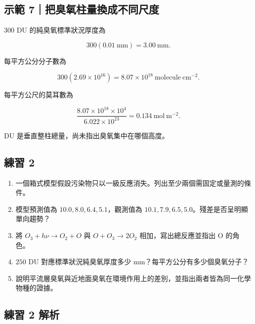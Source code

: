 \documentclass[11pt,a4paper]{article}
\providecommand{\tightlist}{%
  \setlength{\itemsep}{0pt}\setlength{\parskip}{0pt}}
\begin{document}
\begin{HandoutWorkedExample}

\subsection{示範 7｜把臭氧柱量換成不同尺度}\label{ux793aux7bc4-7ux628aux81edux6c27ux67f1ux91cfux63dbux6210ux4e0dux540cux5c3aux5ea6}

\(300\) DU 的純臭氧標準狀況厚度為

\[
300(0.01\ \mathrm{mm})=3.00\ \mathrm{mm}.
\]

每平方公分分子數為

\[
300(2.69\times10^{16})=8.07\times10^{18}\ \mathrm{molecule\ cm^{-2}}.
\]

每平方公尺的莫耳數為

\[
\frac{8.07\times10^{18}\times10^4}{6.022\times10^{23}}
=0.134\ \mathrm{mol\ m^{-2}}.
\]

DU 是垂直整柱總量，尚未指出臭氧集中在哪個高度。

\end{HandoutWorkedExample}

\subsection{練習 2}\label{ux7df4ux7fd2-2}

\begin{enumerate}
\def\labelenumi{\arabic{enumi}.}
\tightlist
\item
  一個箱式模型假設污染物只以一級反應消失。列出至少兩個需固定或量測的條件。
\item
  模型預測值為 \(10.0,8.0,6.4,5.1\)，觀測值為 \(10.1,7.9,6.5,5.0\)。殘差是否呈明顯單向趨勢？
\item
  將 \(O_3+h\nu\rightarrow O_2+O\) 與 \(O+O_3\rightarrow2O_2\) 相加，寫出總反應並指出 O 的角色。
\item
  \(250\) DU 對應標準狀況純臭氧厚度多少 mm？每平方公分有多少個臭氧分子？
\item
  說明平流層臭氧與近地面臭氧在環境作用上的差別，並指出兩者皆為同一化學物種的證據。
\end{enumerate}

\subsection{練習 2 解析}\label{ux7df4ux7fd2-2-ux89e3ux6790}
\end{document}

